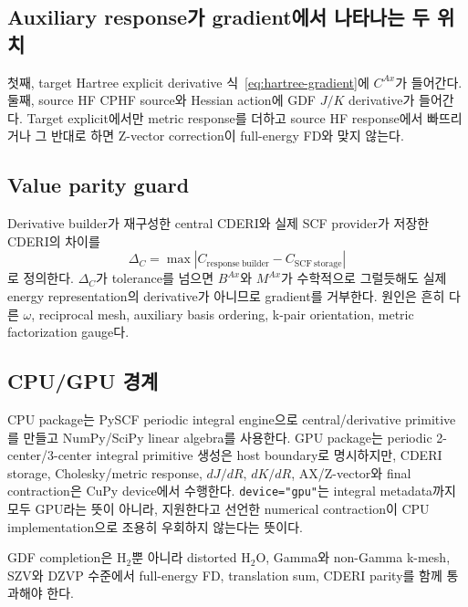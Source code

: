 \subsection{Auxiliary response가 gradient에서 나타나는 두 위치}

첫째, target Hartree explicit derivative 식~\eqref{eq:hartree-gradient}에
$C^{Ax}$가 들어간다. 둘째, source HF CPHF source와 Hessian action에 GDF $J/K$
derivative가 들어간다. Target explicit에서만 metric response를 더하고 source HF
response에서 빠뜨리거나 그 반대로 하면 Z-vector correction이 full-energy FD와 맞지
않는다.

\subsection{Value parity guard}

Derivative builder가 재구성한 central CDERI와 실제 SCF provider가 저장한 CDERI의 차이를
\begin{equation}
  \Delta_C=\max|C_{\mathrm{response\ builder}}-C_{\mathrm{SCF\ storage}}|
  \label{eq:gdf-cderi-parity}
\end{equation}
로 정의한다. $\Delta_C$가 tolerance를 넘으면 $B^{Ax}$와 $M^{Ax}$가 수학적으로
그럴듯해도 실제 energy representation의 derivative가 아니므로 gradient를 거부한다.
원인은 흔히 다른 $\omega$, reciprocal mesh, auxiliary basis ordering, k-pair orientation,
metric factorization gauge다.

\subsection{CPU/GPU 경계}

CPU package는 PySCF periodic integral engine으로 central/derivative primitive를 만들고
NumPy/SciPy linear algebra를 사용한다. GPU package는 periodic 2-center/3-center integral
primitive 생성은 host boundary로 명시하지만, CDERI storage, Cholesky/metric response,
$dJ/dR$, $dK/dR$, AX/Z-vector와 final contraction은 CuPy device에서 수행한다.
\texttt{device="gpu"}는 integral metadata까지 모두 GPU라는 뜻이 아니라, 지원한다고 선언한
numerical contraction이 CPU implementation으로 조용히 우회하지 않는다는 뜻이다.

GDF completion은 H$_2$뿐 아니라 distorted H$_2$O, Gamma와 non-Gamma k-mesh, SZV와
DZVP 수준에서 full-energy FD, translation sum, CDERI parity를 함께 통과해야 한다.

